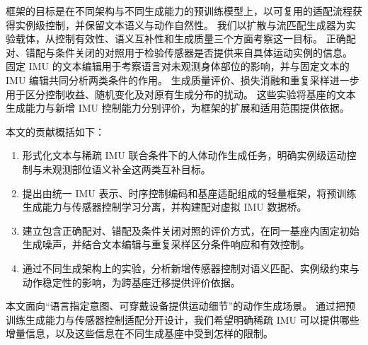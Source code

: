 框架的目标是在不同架构与不同生成能力的预训练模型上，以可复用的适配流程获得实例级控制，并保留文本语义与动作自然性。
我们以扩散与流匹配生成器为实验载体，从控制有效性、语义互补性和生成质量三个方面考察这一目标。
正确配对、错配与条件关闭的对照用于检验传感器是否提供来自具体运动实例的信息。
固定 IMU 的文本编辑用于考察语言对未观测身体部位的影响，并与固定文本的 IMU 编辑共同分析两类条件的作用。
生成质量评价、损失消融和重复采样进一步用于区分控制收益、随机变化及对原有生成分布的扰动。
这些实验将基座的文本生成能力与新增 IMU 控制能力分别评价，为框架的扩展和适用范围提供依据。


本文的贡献概括如下：

\begin{enumerate}
\item 形式化文本与稀疏 IMU 联合条件下的人体动作生成任务，明确实例级运动控制与未观测部位语义补全这两类互补目标。
\item 提出由统一 IMU 表示、时序控制编码和基座适配组成的轻量框架，将预训练生成能力与传感器控制学习分离，并构建配对虚拟 IMU 数据桥。
\item 建立包含正确配对、错配及条件关闭对照的评价方式，在同一基座内固定初始生成噪声，并结合文本编辑与重复采样区分条件响应和有效控制。
\item 通过不同生成架构上的实验，分析新增传感器控制对语义匹配、实例级约束与动作稳定性的影响，为跨基座迁移提供评价依据。
\end{enumerate}

本文面向“语言指定意图、可穿戴设备提供运动细节”的动作生成场景。
通过把预训练生成能力与传感器控制适配分开设计，我们希望明确稀疏 IMU 可以提供哪些增量信息，以及这些信息在不同生成基座中受到怎样的限制。
